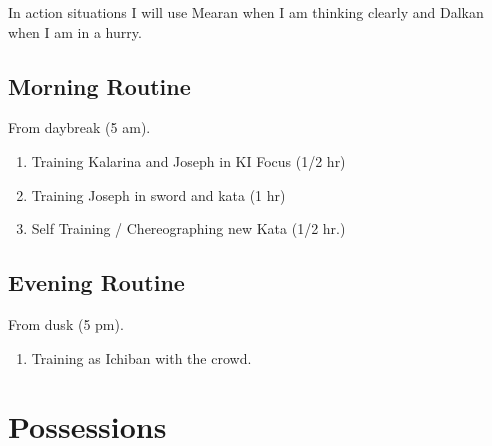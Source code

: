 \documentclass[10pt]{report}
\begin{document}
In action situations I will use Mearan when I am thinking
clearly and Dalkan when I am in a hurry.

\subsection{Morning Routine}

From daybreak (5 am).

\begin{enumerate}
        \item Training Kalarina and Joseph in KI Focus (1/2 hr)
        \item Training Joseph in sword and kata (1 hr)
        \item Self Training / Chereographing new Kata (1/2 hr.)
\end{enumerate}

\subsection{Evening Routine}

From dusk  (5 pm).

\begin{enumerate}
        \item Training as Ichiban with the crowd.
\end{enumerate}


\section{Possessions}
\end{document}
